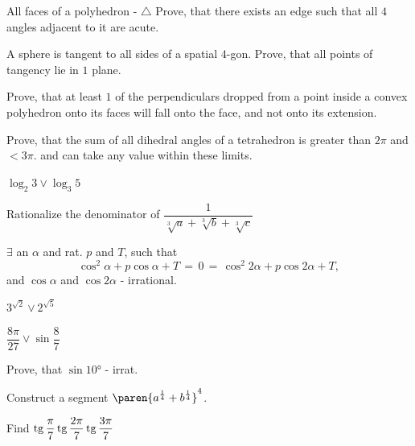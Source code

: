 \documentclass{article}
\begin{document}
\problem  %
All faces of a polyhedron - $\triangle$
Prove, that there exists an edge such that all $4$ angles adjacent to it are acute.


\problem  %
A sphere is tangent to all sides of a spatial $4$-gon.
Prove, that all points of tangency lie in $1$ plane.


\problem  %
Prove, that at least $1$ of the perpendiculars dropped from a point inside a convex polyhedron onto its faces will fall onto the face, and not onto its extension.


\setcounter{problemcounter}{53}


\problem  %
Prove, that the sum of all dihedral angles of a tetrahedron is greater than $2 \pi$ and $< 3 \pi$.
and can take any value within these limits.


\problem  %
$\log_{2}{3} \mathrel{\vee} \log_{3}{5}$


\problem  %
Rationalize the denominator of $\dfrac{1}{\sqrt[3]{a} + \sqrt[3]{b} + \sqrt[3]{c}}$


\setcounter{problemcounter}{57}


\problem  %
$\exists$ an $\alpha$ and rat. $p$ and $T$, such that
\begin{equation*}
  \cos^2 \alpha + p \cos\alpha + T \,
  = \, 0 \,
  = \, \cos^2 2 \alpha + p \cos 2 \alpha + T ,
\end{equation*}
and $\cos\alpha$ and $\cos{2 \alpha}$ - irrational.


\setcounter{problemcounter}{61}


\problem  %
$3^{\sqrt{2}} \mathrel{\vee} 2^{\sqrt{5}}$


\problem  %
$\dfrac{8 \pi}{27} \mathrel{\vee} \sin\dfrac{8}{7}$


\setcounter{problemcounter}{65}


\problem  %
Prove, that $\sin\ang{10}$ - irrat.


\problem  %
Construct a segment $\paren{a^{\frac{1}{4}} + b^{\frac{1}{4}}}^{4}$.


\problem  %
Find $\operatorname{tg}\dfrac{\pi}{7} \operatorname{tg}\dfrac{2 \pi}{7} \operatorname{tg}\dfrac{3 \pi}{7}$
\end{document}
